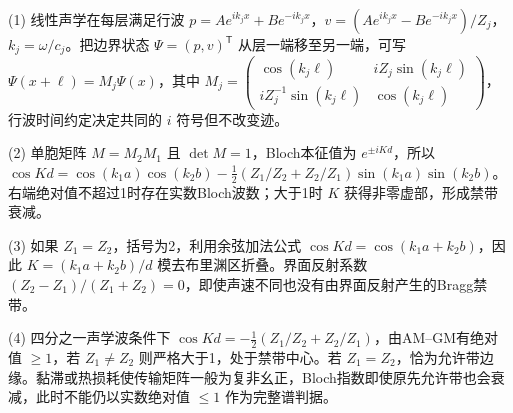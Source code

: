 (1) 线性声学在每层满足行波 \(p=Ae^{ik_jx}+Be^{-ik_jx}\)，\(v=(Ae^{ik_jx}-Be^{-ik_jx})/Z_j\)，\(k_j=\omega/c_j\)。把边界状态 \(\Psi=(p,v)^\mathsf T\) 从层一端移至另一端，可写 \(\Psi(x+\ell)=M_j\Psi(x)\)，其中 \(M_j=\begin{pmatrix}\cos(k_j\ell)&iZ_j\sin(k_j\ell)\\iZ_j^{-1}\sin(k_j\ell)&\cos(k_j\ell)\end{pmatrix}\)，行波时间约定决定共同的 \(i\) 符号但不改变迹。

(2) 单胞矩阵 \(M=M_2M_1\) 且 \(\det M=1\)，Bloch本征值为 \(e^{\pm iKd}\)，所以 \(\boxed{\cos Kd=\cos(k_1a)\cos(k_2b)-\tfrac12(Z_1/Z_2+Z_2/Z_1)\sin(k_1a)\sin(k_2b)}\)。右端绝对值不超过1时存在实数Bloch波数；大于1时 \(K\) 获得非零虚部，形成禁带衰减。

(3) 如果 \(Z_1=Z_2\)，括号为2，利用余弦加法公式 \(\cos Kd=\cos(k_1a+k_2b)\)，因此 \(K=(k_1a+k_2b)/d\) 模去布里渊区折叠。界面反射系数 \((Z_2-Z_1)/(Z_1+Z_2)=0\)，即使声速不同也没有由界面反射产生的Bragg禁带。

(4) 四分之一声学波条件下 \(\cos Kd=-\tfrac12(Z_1/Z_2+Z_2/Z_1)\)，由AM–GM有绝对值 \(\ge1\)，若 \(Z_1\ne Z_2\) 则严格大于1，处于禁带中心。若 \(Z_1=Z_2\)，恰为允许带边缘。黏滞或热损耗使传输矩阵一般为复非幺正，Bloch指数即使原先允许带也会衰减，此时不能仍以实数绝对值 \(\le1\) 作为完整谱判据。
